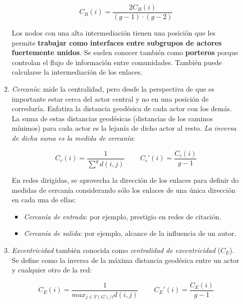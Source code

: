 \documentclass[10pt,spanish, landscape, twocolumn]{article}
\begin{document}
\begin{enumerate}[\color{tematres}{$\star$}]
\begin{enumerate}[---]
        \begin{displaymath}
            C_B(i) = \frac{2 C_B(i)}{(g-1)\cdot(g-2)}
        \end{displaymath}

        Los nodos con una alta intermediación tienen una posición que les permite \textbf{\textcolor{tematres}{trabajar como interfaces entre subgrupos de actores fuertemente unidos}}. Se suelen conocer también como \textbf{\textcolor{tematres}{porteros}} porque controlan el flujo de información entre comunidades. También puede calcularse la intermediación de los enlaces.

        \item \textit{\textcolor{tematres}{Cercanía}}: mide la centralidad, pero desde la perspectiva de que es importante estar cerca del actor central y no en una posición de correduría. Enfatiza la distancia geodésica de cada actor con los demás. La suma de estas distancias geodésicas (distancias de los caminos mínimos) para cada actor es la lejanía de dicho actor al resto. \textit{\textcolor{tematres}{La inversa de dicha suma es la medida de cercanía}}:

        \begin{displaymath}
            C_c (i) = \frac{1}{\sum^g d(i,j)} \qquad\ C_c'(i) = \frac{C_c(i)}{g-1}
        \end{displaymath}

        En redes dirigidas, se aprovecha la dirección de los enlaces para definir do medidas de cercanía considerando sólo los enlaces de una única dirección en cada una de ellas:

        \begin{itemize}
            \item \textit{\textcolor{tematres}{Cercanía de entrada}}: por ejemplo, prestigio en redes de citación.
            \item \textit{\textcolor{tematres}{Cercanía de salida}}: por ejemplo, alcance de la influencia de un autor.
        \end{itemize}

        \item \textit{\textcolor{tematres}{Excentricidad}} también conocida como \textit{\textcolor{tematres}{centralidad de excentricidad}} ($C_E$). Se define como la inversa de la máxima distancia geodésica entre un actor y cualquier otro de la red:

        \begin{displaymath}
            C_E (i) = \frac{1}{max_{j \in V (G)/i} d(i,j)} \qquad\ C_E'(i) = \frac{C_E(i)}{g-1}
        \end{displaymath}


\end{enumerate}
\end{enumerate}
\end{document}

